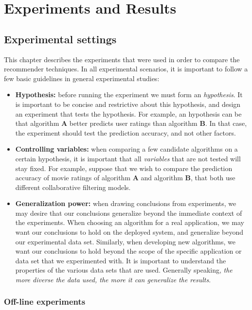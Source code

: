 \chapter{Experiments and Results} \label{results}

\section{Experimental settings} 

This chapter describes the experiments that were used in order
to compare the recommender techniques. 
In all experimental scenarios, it is important to follow a 
few basic guidelines in general experimental 
studies\cite{adomavicius2011context}:
\begin{itemize} 
\item \textbf{Hypothesis:} before running the experiment we must form
an \textit{hypothesis}. It is important to be concise and restrictive
about this hypothesis, and design an experiment that tests the
hypothesis. For example, an hypothesis can be that algorithm
\textbf{A} better predicts user ratings than algorithm \textbf{B}. In
that case, the experiment should test the prediction accuracy, and not
other factors.
\item \textbf{Controlling variables:} when comparing a few candidate
algorithms on a certain hypothesis, it is important that all
\textit{variables} that are not tested will stay fixed. For example,
suppose that we wish to compare the prediction accuracy of movie
ratings of algorithm \textbf{A} and algorithm \textbf{B}, that both
use different collaborative filtering models.
\item \textbf{Generalization power:} when drawing conclusions from
experiments, we may desire that our conclusions generalize beyond the
immediate context of the experiments. When choosing an algorithm for a
real application, we may want our conclusions to hold on the deployed
system, and generalize beyond our experimental data set. Similarly,
when developing new algorithms, we want our conclusions to hold beyond
the scope of the specific application or data set that we experimented
with. It is important to understand the properties of the various data
sets that are used. Generally speaking, \textit{the more diverse the
data used, the more it can generalize the results}.
\end{itemize} 

\subsection{Off-line experiments} 

